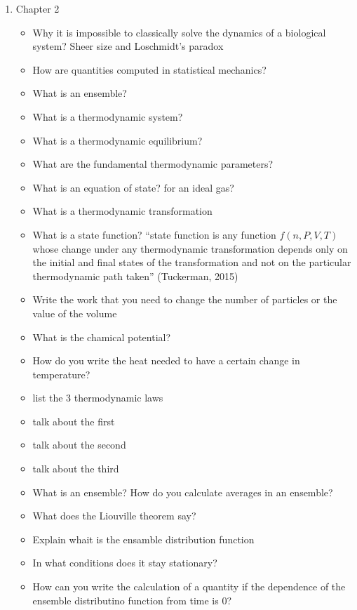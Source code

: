 \begin{enumerate}
    \item Chapter 2
    \begin{itemize}
        \item Why it is impossible to classically solve the dynamics of a biological system? Sheer size and Loschmidt's paradox
        \item How are quantities computed in statistical mechanics?
        \item What is an ensemble?
        \item What is a thermodynamic system?
        \item What is a thermodynamic equilibrium?
        \item What are the fundamental thermodynamic parameters?
        \item What is an equation of state? for an ideal gas?
        \item What is a thermodynamic transformation
        \item What is a state function? “state function is any function $f(n,P,V,T)$ whose change under any thermodynamic transformation depends only on the initial and final states of the transformation and not on the particular thermodynamic path taken” (Tuckerman, 2015)
        \item Write the work that you need to change the number of particles or the value of the volume
        \item What is the chamical potential?
        \item How do you write the heat needed to have a certain change in temperature?
        \item list the 3 thermodynamic laws
        \item talk about the first
        \item talk about the second
        \item talk about the third
        \item What is an ensemble? How do you calculate averages in an ensemble?
        \item What does the Liouville theorem say?
        \item Explain whait is the ensamble distribution function
        \item In what conditions does it stay stationary?
        \item How can you write the calculation of a quantity if the dependence of the ensemble distributino function from time is 0?


    
    \end{itemize}

\end{enumerate}
